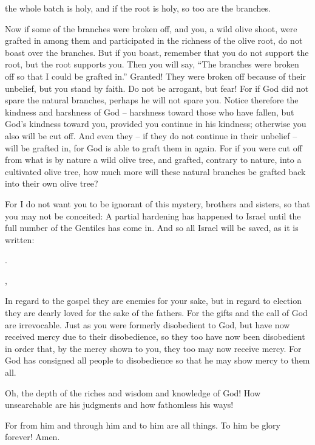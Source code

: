 {the whole batch
is holy, and
if
the root
is holy,
so too
are the branches.
\par }{\PP {}Now
if
some
of the branches
were broken off,
and
you,
a wild olive
shoot, were grafted
in among
them
and
participated
in the richness
of the olive
root,
do
not
boast over
the branches.
But
if
you boast,
remember that you
do not
support
the root,
but
the root
supports you.
Then
you will say,
“The branches
were broken off
so that
I
could be grafted in.”
Granted! They were broken off
because of their unbelief,
but you stand
by faith.
Do
not
be arrogant,
but
fear!
For
if
God
did not spare the natural
branches,
perhaps he will
not
spare
you.
Notice
therefore
the kindness
and
harshness
of God
– harshness
toward
those who have fallen,
but
God’s
kindness
toward
you,
provided you continue
in his kindness;
otherwise
you
also
will be cut off.
And
even they
– if
they do
not
continue
in their unbelief
– will be grafted in,
for
God
is
able
to graft
them
in
again.
For
if
you
were cut off
from what is by
nature
a wild olive tree,
and
grafted,
contrary
to nature,
into
a cultivated olive tree,
how much
more
will
these
natural
branches be grafted back
into their own
olive tree?
\par }{\PP {}For
I do
not
want
you
to be ignorant
of this
mystery,
brothers and sisters,
so that
you may
not
be
conceited: A partial
hardening
has happened
to Israel
until
the full
number of the Gentiles
has come in.
And
so
all
Israel
will be saved,
as
it is written:
\par }{
\par }{.
\par }{\Q {},
\par }{
\par }{\PP {}In regard to
the gospel
they are enemies
for
your
sake,
but
in regard to
election
they are dearly loved
for the sake
of the fathers.
For
the gifts
and
the call
of God
are irrevocable.
Just as
you
were
formerly
disobedient
to God,
but
have
now
received mercy
due to their
disobedience,
so
they
too
have
now
been disobedient
in order that,
by the mercy
shown to you,
they
too
may
now
receive mercy.
For
God
has consigned
all people
to disobedience
so that
he may show mercy
to them all.
\par }{\PP {}Oh,
the depth
of the riches
and
wisdom
and
knowledge
of God! How unsearchable
are his
judgments
and
how fathomless
his
ways!
\par }{\Q {}
\par }{
\par }{\Q {}
\par }{
\par }{\PP {}For
from
him
and
through
him
and
to
him
are all things.
To him
be glory
forever! Amen.

}
